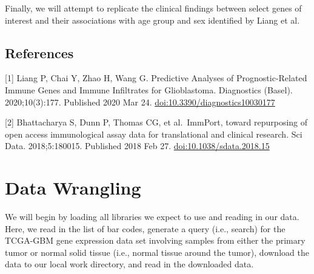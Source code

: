 \documentclass[
]{article}
\begin{document}
Finally, we will attempt to replicate the clinical findings between
select genes of interest and their associations with age group and sex
identified by Liang et al.

\hypertarget{references}{%
\subsection{References}\label{references}}

{[}1{]} Liang P, Chai Y, Zhao H, Wang G. Predictive Analyses of
Prognostic-Related Immune Genes and Immune Infiltrates for Glioblastoma.
Diagnostics (Basel). 2020;10(3):177. Published 2020 Mar 24.
\url{doi:10.3390/diagnostics10030177}

{[}2{]} Bhattacharya S, Dunn P, Thomas CG, et al.~ImmPort, toward
repurposing of open access immunological assay data for translational
and clinical research. Sci Data. 2018;5:180015. Published 2018 Feb 27.
\url{doi:10.1038/sdata.2018.15}

\newpage

\hypertarget{data-wrangling}{%
\section{Data Wrangling}\label{data-wrangling}}

We will begin by loading all libraries we expect to use and reading in
our data. Here, we read in the list of bar codes, generate a query
(i.e., search) for the TCGA-GBM gene expression data set involving
samples from either the primary tumor or normal solid tissue (i.e.,
normal tissue around the tumor), download the data to our local work
directory, and read in the downloaded data.
\end{document}
